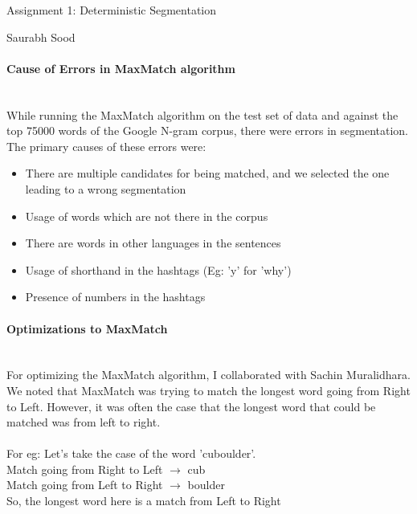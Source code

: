 \documentclass{article}
\begin{document}
\begin{center}{\LARGE Assignment 1: Deterministic Segmentation}\end{center}
\begin{center}{\normalsize Saurabh Sood}\end{center}


\paragraph{Cause of Errors in MaxMatch algorithm} \hspace{0pt} \\
\normalsize While running the MaxMatch algorithm on the test set of data and against the top 75000 words of the Google N-gram corpus, there were errors in segmentation. The primary causes of these errors were:
\begin{itemize}
\item There are multiple candidates for being matched, and we selected the one leading to a wrong segmentation
\item Usage of words which are not there in the corpus
\item There are words in other languages in the sentences
\item Usage of shorthand in the hashtags (Eg: 'y' for 'why')
\item Presence of numbers in the hashtags
\end{itemize}

\paragraph{Optimizations to MaxMatch} \hspace{0pt} \\
\normalsize For optimizing the MaxMatch algorithm, I collaborated with Sachin Muralidhara. We noted that MaxMatch was trying to match the longest word going from Right to Left. However, it was often the case that the longest word that could be matched was from left to right. \\ \\
For eg: Let's take the case of the word 'cuboulder'. \\
Match going from Right to Left $\rightarrow$ cub \\
Match going from Left to Right $\rightarrow$ boulder \\
So, the longest word here is a match from Left to Right \\ \\
\end{document}
